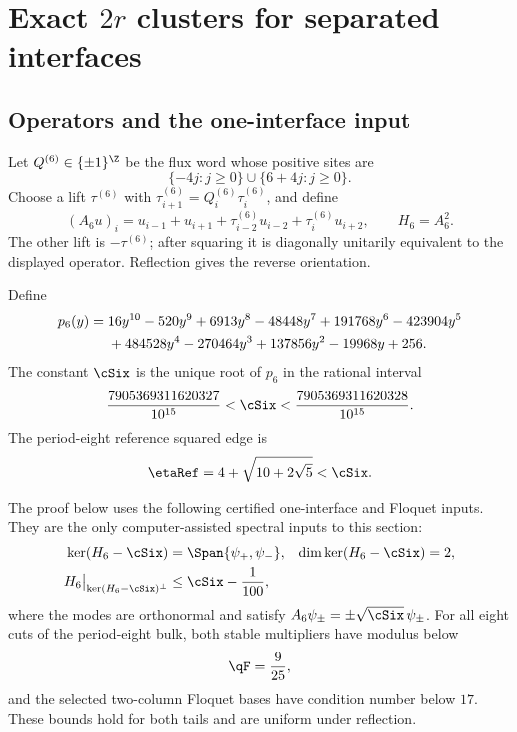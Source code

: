 \section{Exact \texorpdfstring{\(2r\)}{2r} clusters for separated interfaces}
\label{sec:exact-2r}

\subsection{Operators and the one-interface input}

Let \(Q^{(6)}\in\{\pm1\}^{\Z}\) be the flux word whose positive sites are
\[
 \{ -4j:j\geq 0\}\cup\{6+4j:j\geq0\}.
\]
Choose a lift \(\tau^{(6)}\) with
\(\tau^{(6)}_{i+1}=Q^{(6)}_i\tau^{(6)}_i\), and define
\begin{equation}
 (A_6u)_i=u_{i-1}+u_{i+1}
 +\tau^{(6)}_{i-2}u_{i-2}+\tau^{(6)}_iu_{i+2},
 \qquad H_6=A_6^2 .
 \label{eq:g6-operator}
\end{equation}
The other lift is \(-\tau^{(6)}\); after squaring it is diagonally unitarily
equivalent to the displayed operator.  Reflection gives the reverse
orientation.

Define
\begin{align}
 p_6(y)={}&16y^{10}-520y^9+6913y^8-48448y^7+191768y^6
 -423904y^5 \notag\\
 &+484528y^4-270464y^3+137856y^2-19968y+256.
 \label{eq:p6}
\end{align}
The constant \(\cSix\) is the unique root of \(p_6\) in the rational
interval
\begin{equation}
 \frac{7905369311620327}{10^{15}}<\cSix<
 \frac{7905369311620328}{10^{15}}.
 \label{eq:c6-interval}
\end{equation}
The period-eight reference squared edge is
\begin{equation}
 \etaRef=4+\sqrt{10+2\sqrt5}<\cSix.
 \label{eq:eta}
\end{equation}

The proof below uses the following certified one-interface and Floquet
inputs.  They are the only computer-assisted spectral inputs to this
section:
\begin{align}
 \ker(H_6-\cSix)&=\Span\{\psi_+,\psi_-\},
 &\dim\ker(H_6-\cSix)&=2, \label{eq:rank-two-input}\\
 H_6\big|_{\ker(H_6-\cSix)^\perp}&\leq \cSix-\frac1{100},
 \label{eq:complement-input}
\end{align}
where the modes are orthonormal and satisfy
\(A_6\psi_\pm=\pm\sqrt{\cSix}\,\psi_\pm\).  For all eight cuts of the
period-eight bulk, both stable multipliers have modulus below
\begin{equation}
 \qF=\frac9{25},
 \label{eq:qf}
\end{equation}
and the selected two-column Floquet bases have condition number below
\(17\).  These bounds hold for both tails and are uniform under reflection.

